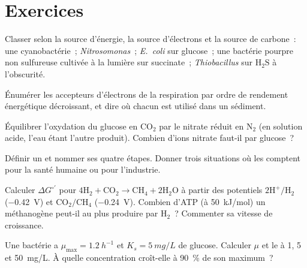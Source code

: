 \section{Exercices}

\begin{exercise}[$\star$]\label{exo:b2:microbial-metabolism:1}
Classer selon la source d'énergie, la source d'électrons et la source
de carbone~: une cyanobactérie~; \emph{Nitrosomonas}~; \emph{E.~coli}
sur glucose~; une bactérie pourpre non sulfureuse cultivée à la lumière
sur succinate~; \emph{Thiobacillus} sur $\mathrm{H_2S}$ à l'obscurité.
\end{exercise}

\begin{exercise}[$\star$]\label{exo:b2:microbial-metabolism:2}
Énumérer les accepteurs d'électrons de la respiration par ordre de
rendement énergétique décroissant, et dire où chacun est utilisé dans
un sédiment.
\end{exercise}

\begin{exercise}[$\star$]\label{exo:b2:microbial-metabolism:3}
Équilibrer l'oxydation du glucose en $\mathrm{CO_2}$ par le nitrate
réduit en $\mathrm{N_2}$ (en solution acide, l'eau étant l'autre
produit). Combien d'ions nitrate faut-il par glucose~?
\end{exercise}

\begin{exercise}[$\star$]\label{exo:b2:microbial-metabolism:4}
Définir un  et nommer ses quatre étapes. Donner trois situations
où les  comptent pour la santé humaine ou pour l'industrie.
\end{exercise}

\begin{exercise}[$\star\star$]\label{exo:b2:microbial-metabolism:5}
Calculer $\Delta G^{\circ\prime}$ pour $4\mathrm{H_2} + \mathrm{CO_2}
\to \mathrm{CH_4} + 2\mathrm{H_2O}$ à partir des potentiels
$\mathrm{2H^+/H_2}$ (\qty{-0.42}{V}) et $\mathrm{CO_2/CH_4}$
(\qty{-0.24}{V}). Combien d'ATP (à \qty{50}{kJ/mol}) un méthanogène
peut-il au plus produire par $\mathrm{H_2}$~? Commenter sa vitesse de
croissance.
\end{exercise}

\begin{exercise}[$\star\star$]\label{exo:b2:microbial-metabolism:6}
Une bactérie a $\mu_{\max} = \qty{1.2}{h^{-1}}$ et $K_s =
\qty{5}{mg/L}$ de glucose. Calculer $\mu$ et le  à
1, 5 et \qty{50}{mg/L}. À quelle concentration croît-elle à
\qty{90}{\%} de son maximum~?
\end{exercise}

